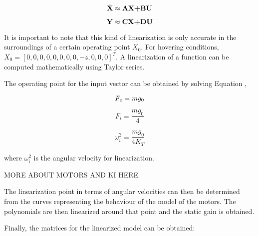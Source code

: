 \begin{equation}
\label{s1} 
 	\dot{\textbf{X}}\approx\textbf{AX+BU} \\
 \end{equation}

\begin{equation}
\label{s2} 
 	\textbf{Y}\approx\textbf{CX+DU} \\
 \end{equation}

It is important to note that this kind of linearization is only accurate in the surroundings of a certain operating point $X_{0}$. For hovering conditions, $X_{0}=[0, 0, 0, 0, 0, 0, 0, 0, -z, 0, 0, 0]^{T}$. A linearization of a function can be computed mathematically using Taylor series.

The operating point for the input vector can be obtained by solving Equation ,

\begin{equation}
\label{s10} 
 	F_{z}=mg_{0} \\
 \end{equation}
 
 \begin{equation}
\label{s11} 
 	F_{i}=\frac{mg_{0}}{4}
 \end{equation}
 
 \begin{equation}
\label{s12} 
 	\omega_{i}^{2}=\frac{mg_{0}}{4K_{T}}
 \end{equation}
 
where $\omega_{i}^{2}$ is the angular velocity for linearization.

MORE ABOUT MOTORS AND KI HERE

The linearization point in terms of angular velocities can then be determined from the curves representing the behaviour of the model of the motors. The polynomials are then linearized around that point and the static gain is obtained.

Finally, the matrices for the linearized model can be obtained:

\setcounter{MaxMatrixCols}{20}

